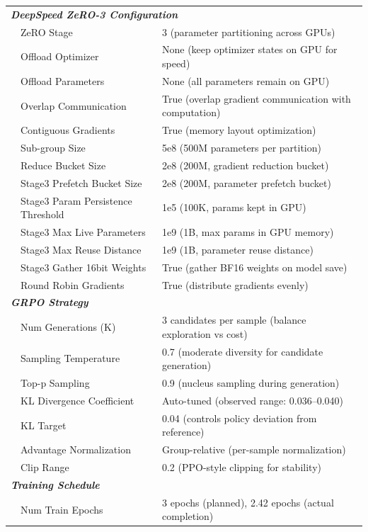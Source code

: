 \documentclass[11pt]{article}
\begin{document}
\begin{table}[t]
\begin{tabular}{llp{10cm}}
\hline
\multicolumn{3}{l}{\textit{\textbf{DeepSpeed ZeRO-3 Configuration}}} \\
& ZeRO Stage & 3 (parameter partitioning across GPUs) \\
& Offload Optimizer & None (keep optimizer states on GPU for speed) \\
& Offload Parameters & None (all parameters remain on GPU) \\
& Overlap Communication & True (overlap gradient communication with computation) \\
& Contiguous Gradients & True (memory layout optimization) \\
& Sub-group Size & 5e8 (500M parameters per partition) \\
& Reduce Bucket Size & 2e8 (200M, gradient reduction bucket) \\
& Stage3 Prefetch Bucket Size & 2e8 (200M, parameter prefetch bucket) \\
& Stage3 Param Persistence Threshold & 1e5 (100K, params kept in GPU) \\
& Stage3 Max Live Parameters & 1e9 (1B, max params in GPU memory) \\
& Stage3 Max Reuse Distance & 1e9 (1B, parameter reuse distance) \\
& Stage3 Gather 16bit Weights & True (gather BF16 weights on model save) \\
& Round Robin Gradients & True (distribute gradients evenly) \\
\hline
\multicolumn{3}{l}{\textit{\textbf{GRPO Strategy}}} \\
& Num Generations (K) & 3 candidates per sample (balance exploration vs cost) \\
& Sampling Temperature & 0.7 (moderate diversity for candidate generation) \\
& Top-p Sampling & 0.9 (nucleus sampling during generation) \\
& KL Divergence Coefficient & Auto-tuned (observed range: 0.036--0.040) \\
& KL Target & 0.04 (controls policy deviation from reference) \\
& Advantage Normalization & Group-relative (per-sample normalization) \\
& Clip Range & 0.2 (PPO-style clipping for stability) \\
\hline
\multicolumn{3}{l}{\textit{\textbf{Training Schedule}}} \\
& Num Train Epochs & 3 epochs (planned), 2.42 epochs (actual completion) \\

\end{tabular}
\end{table}
\end{document}
